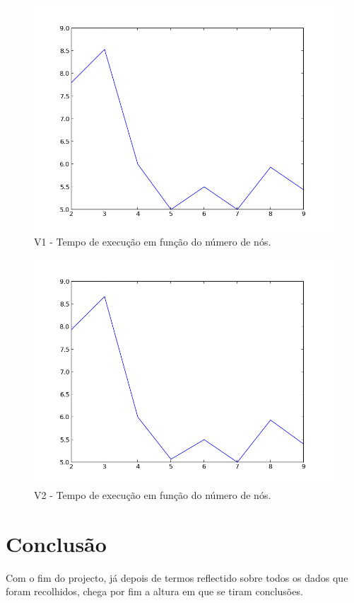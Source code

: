 \documentclass[a4paper]{article}
\begin{document}
\begin{figure}[h]
	\includegraphics[keepaspectratio=true, width=0.4\textheight]{imgs/scalabilityv1.png}
	\caption{V1 - Tempo de execução em função do número de nós.}
\end{figure}
\begin{figure}[h]
	\includegraphics[keepaspectratio=true, width=0.4\textheight]{imgs/scalabilityv2.png}
	\caption{V2 - Tempo de execução em função do número de nós.}
\end{figure}
\clearpage


\section{Conclusão}
\indent \indent Com o fim do projecto, já depois de termos reflectido sobre todos os dados que foram recolhidos, chega por fim a altura em que se tiram conclusões.
\end{document}
